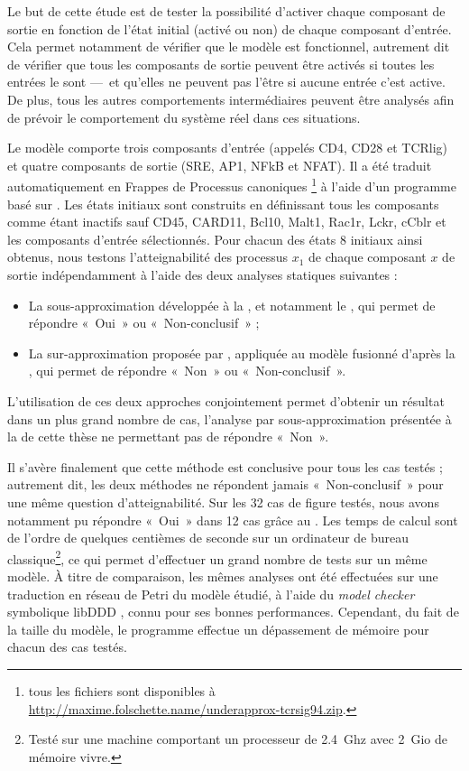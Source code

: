 Le but de cette étude est de tester la possibilité d'activer chaque composant de sortie
en fonction de l'état initial (activé ou non) de chaque composant d'entrée.
Cela permet notamment de vérifier que le modèle est fonctionnel,
autrement dit de vérifier que
tous les composants de sortie peuvent être activés si toutes les entrées le sont
---~et qu'elles ne peuvent pas l'être si aucune entrée c'est active.
De plus, tous les autres comportements intermédiaires peuvent être analysés
afin de prévoir le comportement du système réel dans ces situations.

Le modèle comporte trois composants d'entrée (appelés CD4, CD28 et TCRlig)
et quatre composants de sortie (SRE, AP1, NFkB et NFAT).
Il a été traduit automatiquement en Frappes de Processus canoniques%
\footnote{tous les fichiers sont disponibles à
\url{http://maxime.folschette.name/underapprox-tcrsig94.zip}.}
à l'aide d'un programme basé sur \storef.
Les états initiaux sont construits en définissant tous les composants
comme étant inactifs sauf CD45, CARD11, Bcl10, Malt1, Rac1r, Lckr, cCblr
et les composants d'entrée sélectionnés.
Pour chacun des états 8 initiaux ainsi obtenus,
nous testons l'atteignabilité des processus $x_1$ de chaque composant $x$ de sortie
indépendamment à l'aide des deux analyses statiques suivantes :
\begin{itemize}
  \item La sous-approximation développée à la ,
    et notamment le ,
    qui permet de répondre «~Oui~» ou «~Non-conclusif~» ;
  \item La sur-approximation proposée par ,
    appliquée au modèle fusionné d'après la ,
    qui permet de répondre «~Non~» ou «~Non-conclusif~».
\end{itemize}
L'utilisation de ces deux approches conjointement permet d'obtenir un résultat dans un
plus grand nombre de cas,
l'analyse par sous-approximation présentée à la  de cette thèse
ne permettant pas de répondre «~Non~».

Il s'avère finalement que cette méthode est conclusive pour tous les cas testés ;
autrement dit, les deux méthodes ne répondent jamais «~Non-conclusif~»
pour une même question d'atteignabilité.
Sur les 32 cas de figure testés,
nous avons notamment pu répondre «~Oui~» dans 12 cas
grâce au .
Les temps de calcul sont de l'ordre de quelques centièmes de seconde sur un ordinateur
de bureau classique\footnote{Testé sur une machine comportant
un processeur de 2.4~Ghz avec 2~Gio de mémoire vivre.},
ce qui permet d'effectuer un grand nombre de tests sur un même modèle.
À titre de comparaison, les mêmes analyses ont été effectuées 
sur une traduction en réseau de Petri du modèle étudié,
à l'aide du \textit{model checker} symbolique libDDD \cite{Kordon09libddd},
connu pour ses bonnes performances.
Cependant, du fait de la taille du modèle, le programme effectue un dépassement de mémoire
pour chacun des cas testés.

